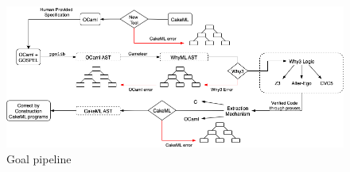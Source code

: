 \begin{figure}[H]
    \centering
    \includegraphics[width=\linewidth]{images/Goal_Pipeline.png}
    \caption{Goal pipeline}
\end{figure}



